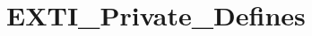 \hypertarget{group___e_x_t_i___private___defines}{\section{E\-X\-T\-I\-\_\-\-Private\-\_\-\-Defines}
\label{group___e_x_t_i___private___defines}
}
